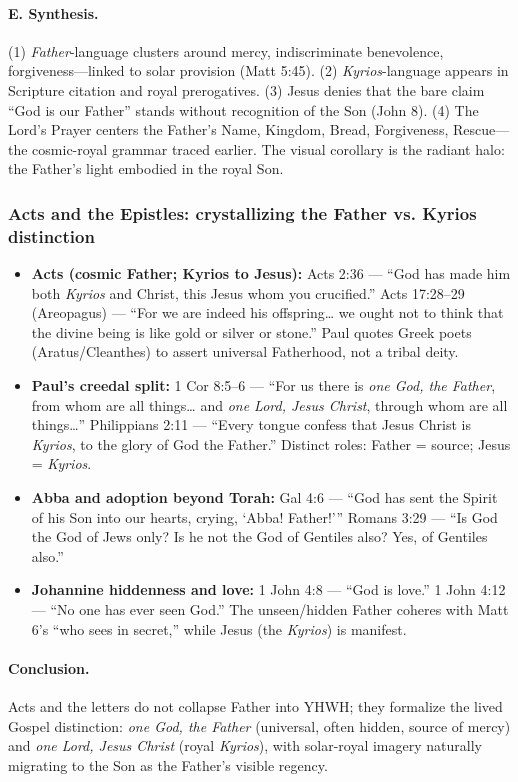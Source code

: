 \paragraph{E. Synthesis.}
(1) \emph{Father}-language clusters around mercy, indiscriminate benevolence, forgiveness—linked to solar provision (Matt 5:45). (2) \emph{Kyrios}-language appears in Scripture citation and royal prerogatives. (3) Jesus denies that the bare claim “God is our Father” stands without recognition of the Son (John 8). (4) The Lord’s Prayer centers the Father’s Name, Kingdom, Bread, Forgiveness, Rescue—the cosmic-royal grammar traced earlier. The visual corollary is the radiant halo: the Father’s light embodied in the royal Son.

\subsubsection{Acts and the Epistles: crystallizing the Father vs. Kyrios distinction}\label{subsubsec:acts-epistles-father-kyrios}
\begin{itemize}
    \item \textbf{Acts (cosmic Father; Kyrios to Jesus):} Acts 2:36 — “God has made him both \emph{Kyrios} and Christ, this Jesus whom you crucified.” Acts 17:28–29 (Areopagus) — “For we are indeed his offspring… we ought not to think that the divine being is like gold or silver or stone.” Paul quotes Greek poets (Aratus/Cleanthes) to assert universal Fatherhood, not a tribal deity.
    \item \textbf{Paul’s creedal split:} 1 Cor 8:5–6 — “For us there is \emph{one God, the Father}, from whom are all things… and \emph{one Lord, Jesus Christ}, through whom are all things…” Philippians 2:11 — “Every tongue confess that Jesus Christ is \emph{Kyrios}, to the glory of God the Father.” Distinct roles: Father = source; Jesus = \emph{Kyrios}.
    \item \textbf{Abba and adoption beyond Torah:} Gal 4:6 — “God has sent the Spirit of his Son into our hearts, crying, ‘Abba! Father!’” Romans 3:29 — “Is God the God of Jews only? Is he not the God of Gentiles also? Yes, of Gentiles also.”
    \item \textbf{Johannine hiddenness and love:} 1 John 4:8 — “God is love.” 1 John 4:12 — “No one has ever seen God.” The unseen/hidden Father coheres with Matt 6’s “who sees in secret,” while Jesus (the \emph{Kyrios}) is manifest.
\end{itemize}
\paragraph{Conclusion.} Acts and the letters do not collapse Father into YHWH; they formalize the lived Gospel distinction: \emph{one God, the Father} (universal, often hidden, source of mercy) and \emph{one Lord, Jesus Christ} (royal \emph{Kyrios}), with solar-royal imagery naturally migrating to the Son as the Father’s visible regency.
